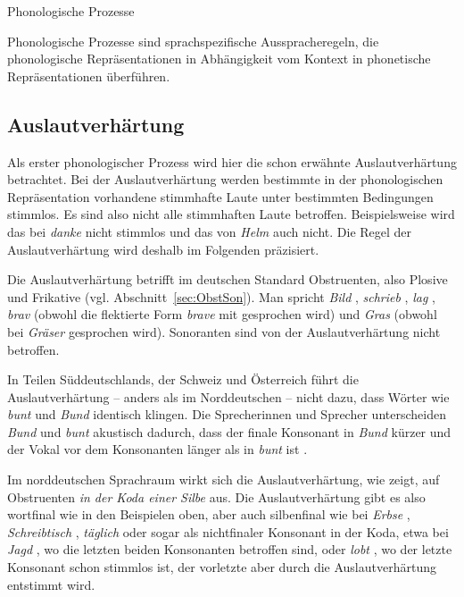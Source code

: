 \begin{Definition}{Phonologische Prozesse}

\noindent Phonologische Prozesse sind sprachspezifische Ausspracheregeln, die phonologische Repräsentationen in Abhängigkeit vom Kontext in phonetische Repräsentationen überführen.

\end{Definition}


\subsection{Auslautverhärtung}\label{sec:Auslautverhaertung}

Als erster phonologischer Prozess wird hier die schon erwähnte Auslautverhärtung betrachtet. Bei der Auslautverhärtung werden bestimmte in der phonologischen Repräsentation vorhandene stimmhafte Laute unter bestimmten Bedingungen stimmlos. Es sind also nicht alle stimmhaften Laute betroffen. Beispielsweise wird das  bei \textit{danke} nicht stimmlos und das  von \textit{Helm} auch nicht. Die Regel der Auslautverhärtung wird deshalb im Folgenden präzisiert. 

Die Auslautverhärtung betrifft im deutschen Standard Obstruenten, also Plosive und Frikative (vgl. Abschnitt~\ref{sec:ObstSon}). Man spricht \textit{Bild} \textipa{[bIlt]}, \textit{schrieb} \textipa{[SKi:p]}, \textit{lag} \textipa{[la:k]}, \textit{brav} \textipa{[bKa:f]} (obwohl die flektierte Form \textit{brave} mit \textipa{[v]} gesprochen wird) und \textit{Gras} \textipa{[gKa:s]} (obwohl bei \textit{Gräser} \textipa{[z]} gesprochen wird). Sonoranten sind von der Auslautverhärtung nicht betroffen. 

In Teilen Süddeutschlands, der Schweiz und Österreich führt die Auslautverhärtung -- anders als im Norddeutschen -- nicht dazu, dass Wörter wie \textit{bunt} und \textit{Bund} identisch klingen. Die Sprecherinnen und Sprecher unterscheiden \textit{Bund} und \textit{bunt} akustisch dadurch, dass der finale Konsonant in \textit{Bund} kürzer und der Vokal vor dem Konsonanten länger als in \textit{bunt} ist \citep[72]{DudenAussprache2023}.

Im norddeutschen Sprachraum wirkt sich die Auslautverhärtung, wie \citet[242]{Hall2000} zeigt, auf Obstruenten \textit{in der Koda einer Silbe} aus. Die Auslautverhärtung gibt es also wortfinal wie in den Beispielen oben, aber auch silbenfinal wie bei \textit{Erbse} \textipa{[\textprimstress PE5p.z@]}, \textit{Schreibtisch} , \textit{täglich} \textipa{[\textprimstress te:k.lI\c{c}]} oder sogar als nichtfinaler Konsonant in der Koda, etwa bei \textit{Jagd} \textipa{[ja:kt]}, wo die letzten beiden Konsonanten betroffen sind, oder \textit{lobt} \textipa{[lo:pt]}, wo der letzte Konsonant schon stimmlos ist, der vorletzte aber durch die Auslautverhärtung entstimmt wird.


